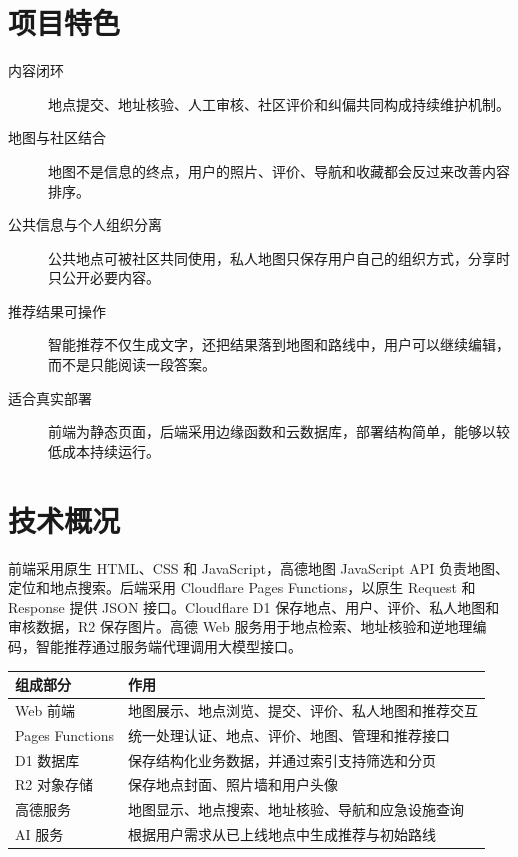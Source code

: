 \documentclass[UTF8,a4paper,12pt]{ctexart}
\begin{document}
\section{项目特色}

\begin{description}
  \item[内容闭环] 地点提交、地址核验、人工审核、社区评价和纠偏共同构成持续维护机制。
  \item[地图与社区结合] 地图不是信息的终点，用户的照片、评价、导航和收藏都会反过来改善内容排序。
  \item[公共信息与个人组织分离] 公共地点可被社区共同使用，私人地图只保存用户自己的组织方式，分享时只公开必要内容。
  \item[推荐结果可操作] 智能推荐不仅生成文字，还把结果落到地图和路线中，用户可以继续编辑，而不是只能阅读一段答案。
  \item[适合真实部署] 前端为静态页面，后端采用边缘函数和云数据库，部署结构简单，能够以较低成本持续运行。
\end{description}

\section{技术概况}

前端采用原生 HTML、CSS 和 JavaScript，高德地图 JavaScript API 负责地图、定位和地点搜索。后端采用 Cloudflare Pages Functions，以原生 Request 和 Response 提供 JSON 接口。Cloudflare D1 保存地点、用户、评价、私人地图和审核数据，R2 保存图片。高德 Web 服务用于地点检索、地址核验和逆地理编码，智能推荐通过服务端代理调用大模型接口。

\begin{center}
\begin{tabular}{>{\raggedright\arraybackslash}p{3.2cm}p{9.2cm}}
\toprule
组成部分 & 作用 \\
\midrule
Web 前端 & 地图展示、地点浏览、提交、评价、私人地图和推荐交互 \\
Pages Functions & 统一处理认证、地点、评价、地图、管理和推荐接口 \\
D1 数据库 & 保存结构化业务数据，并通过索引支持筛选和分页 \\
R2 对象存储 & 保存地点封面、照片墙和用户头像 \\
高德服务 & 地图显示、地点搜索、地址核验、导航和应急设施查询 \\
AI 服务 & 根据用户需求从已上线地点中生成推荐与初始路线 \\
\bottomrule
\end{tabular}
\end{center}
\end{document}
